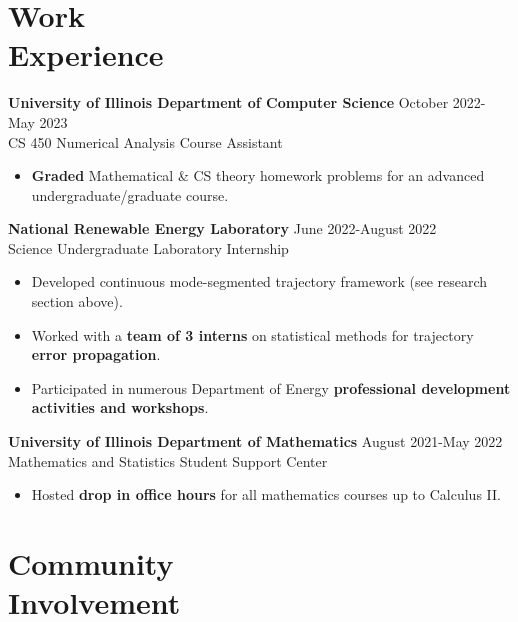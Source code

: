 \documentclass[resmargin, 10pt]{res} %
\begin{document}
\begin{resume}
\section{Work \\ Experience}

{\bf University of Illinois Department of Computer Science} \hfill October 2022-May 2023 \\
CS 450 Numerical Analysis Course Assistant
\begin{itemize}[itemsep=0em]
\item \textbf{Graded} Mathematical \& CS theory homework problems for an advanced undergraduate/graduate course.
\end{itemize} 

\vspace{-8pt}
{\bf National Renewable Energy Laboratory} \hfill June 2022-August 2022 \\
Science Undergraduate Laboratory Internship
\begin{itemize}[itemsep=0em]
\item Developed continuous mode-segmented trajectory framework (see research section above).
\item Worked with a \textbf{team of 3 interns} on statistical methods for trajectory \textbf{error propagation}.
\item Participated in numerous Department of Energy \textbf{professional development activities and workshops}.
\end{itemize} 

\vspace{-8pt}
{\bf University of Illinois Department of Mathematics} \hfill August 2021-May 2022 \\
Mathematics and Statistics Student Support Center
\begin{itemize}[itemsep=0em]
\item Hosted \textbf{drop in office hours} for all mathematics courses up to Calculus II.
\end{itemize} 



\vspace{-8pt}
\section{Community \\ Involvement}


\end{resume}
\end{document}
